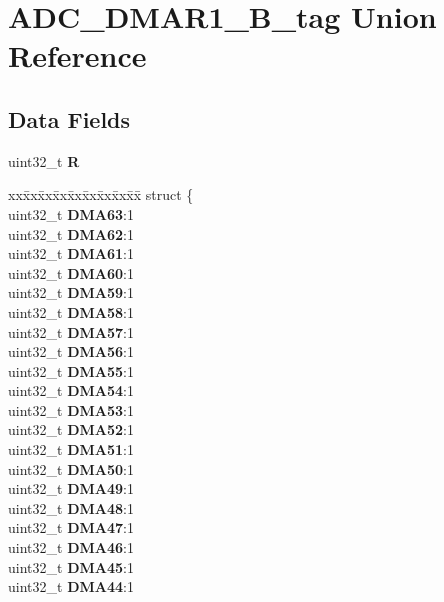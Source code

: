 \hypertarget{unionADC__DMAR1__32B__tag}{}\section{A\+D\+C\+\_\+\+D\+M\+A\+R1\+\_\+B\+\_\+tag Union Reference}
\label{unionADC__DMAR1__32B__tag}
\subsection*{Data Fields}
\begin{DoxyCompactItemize}
\item 
\mbox{\label{unionADC__DMAR1__32B__tag_aa381fae7fc104900a1bd4651a2ae072b}} 
uint32\+\_\+t {\bfseries R}
\item 
\mbox{\label{unionADC__DMAR1__32B__tag_aed473b7573e5698e26fc405172928ca8}} 
\begin{tabbing}
xx\=xx\=xx\=xx\=xx\=xx\=xx\=xx\=xx\=\kill
struct \{\\
\>uint32\_t {\bfseries DMA63}:1\\
\>uint32\_t {\bfseries DMA62}:1\\
\>uint32\_t {\bfseries DMA61}:1\\
\>uint32\_t {\bfseries DMA60}:1\\
\>uint32\_t {\bfseries DMA59}:1\\
\>uint32\_t {\bfseries DMA58}:1\\
\>uint32\_t {\bfseries DMA57}:1\\
\>uint32\_t {\bfseries DMA56}:1\\
\>uint32\_t {\bfseries DMA55}:1\\
\>uint32\_t {\bfseries DMA54}:1\\
\>uint32\_t {\bfseries DMA53}:1\\
\>uint32\_t {\bfseries DMA52}:1\\
\>uint32\_t {\bfseries DMA51}:1\\
\>uint32\_t {\bfseries DMA50}:1\\
\>uint32\_t {\bfseries DMA49}:1\\
\>uint32\_t {\bfseries DMA48}:1\\
\>uint32\_t {\bfseries DMA47}:1\\
\>uint32\_t {\bfseries DMA46}:1\\
\>uint32\_t {\bfseries DMA45}:1\\
\>uint32\_t {\bfseries DMA44}:1\\

\end{tabbing}
\end{DoxyCompactItemize}

